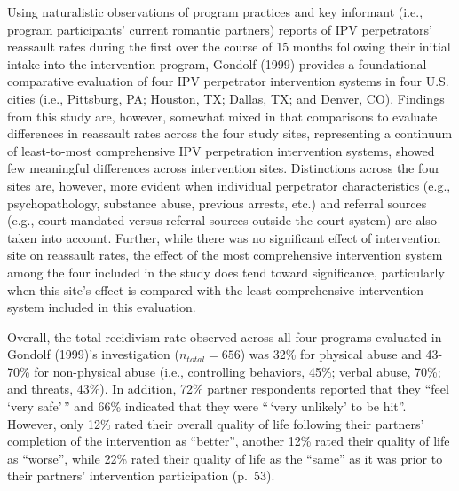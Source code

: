\documentclass[11pt,]{tufte-book}
\begin{document}
Using naturalistic observations of program practices and key informant
(i.e., program participants' current romantic partners) reports of IPV
perpetrators' reassault rates during the first over the course of 15
months following their initial intake into the intervention program,
Gondolf (1999) provides a foundational comparative evaluation of four
IPV perpetrator intervention systems in four U.S. cities (i.e.,
Pittsburg, PA; Houston, TX; Dallas, TX; and Denver, CO). Findings from
this study are, however, somewhat mixed in that comparisons to evaluate
differences in reassault rates across the four study sites, representing
a continuum of least-to-most comprehensive IPV perpetration intervention
systems, showed few meaningful differences across intervention sites.
Distinctions across the four sites are, however, more evident when
individual perpetrator characteristics (e.g., psychopathology, substance
abuse, previous arrests, etc.) and referral sources (e.g.,
court-mandated versus referral sources outside the court system) are
also taken into account. Further, while there was no significant effect
of intervention site on reassault rates, the effect of the most
comprehensive intervention system among the four included in the study
does tend toward significance, particularly when this site's effect is
compared with the least comprehensive intervention system included in
this evaluation.

Overall, the total recidivism rate observed across all four programs
evaluated in Gondolf (1999)'s investigation (\(n_{total} = 656\)) was
32\% for physical abuse and 43-70\% for non-physical abuse (i.e.,
controlling behaviors, 45\%; verbal abuse, 70\%; and threats, 43\%). In
addition, 72\% partner respondents reported that they ``feel `very
safe'\,'' and 66\% indicated that they were ``\,`very unlikely' to be
hit''. However, only 12\% rated their overall quality of life following
their partners' completion of the intervention as ``better'', another
12\% rated their quality of life as ``worse'', while 22\% rated their
quality of life as the ``same'' as it was prior to their partners'
intervention participation (p.~53).
\end{document}
